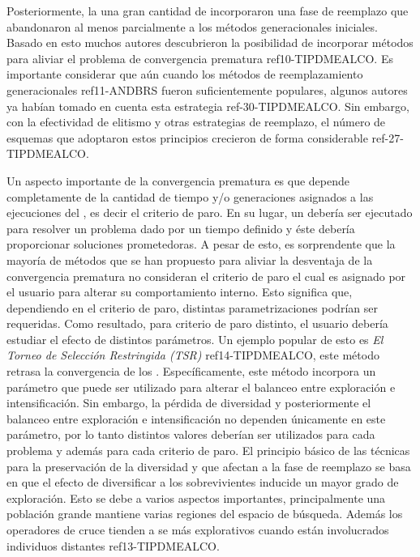 %
Posteriormente, la una gran cantidad de \EAS{} incorporaron una fase de reemplazo que abandonaron al menos parcialmente a los métodos generacionales iniciales.
%
Basado en esto muchos autores descubrieron la posibilidad de incorporar métodos para aliviar el problema de convergencia prematura ref10-TIPDMEALCO.
%
Es importante considerar que aún cuando los métodos de reemplazamiento generacionales ref11-ANDBRS fueron suficientemente populares, algunos autores ya habían tomado en cuenta esta estrategia ref-30-TIPDMEALCO.
%
Sin embargo, con la efectividad de elitismo y otras estrategias de reemplazo, el número de esquemas que adoptaron estos principios crecieron de forma considerable ref-27-TIPDMEALCO.
%

Un aspecto importante de la convergencia prematura es que depende completamente de la cantidad de tiempo y/o generaciones asignados a las ejecuciones del \EA{}, es decir el criterio de paro.
%
En su lugar, un \EA{} debería ser ejecutado para resolver un problema dado por un tiempo definido y éste debería proporcionar soluciones prometedoras.
%
A pesar de esto, es sorprendente que la mayoría de métodos que se han propuesto para aliviar la desventaja de la convergencia prematura no consideran el criterio de paro el cual es asignado por el usuario para alterar su comportamiento interno.
%
Esto significa que, dependiendo en el criterio de paro, distintas parametrizaciones podrían ser requeridas.
%
Como resultado, para criterio de paro distinto, el usuario debería estudiar el efecto de distintos parámetros.
%
Un ejemplo popular de esto es \textit{El Torneo de Selección Restringida (TSR)} ref14-TIPDMEALCO, este método retrasa la convergencia de los \EAS{}.
%
Específicamente, este método incorpora un parámetro que puede ser utilizado para alterar el balanceo entre exploración e intensificación.
%
Sin embargo, la pérdida de diversidad y posteriormente el balanceo entre exploración e intensificación no dependen únicamente en este parámetro, por lo tanto distintos valores deberían ser utilizados para cada problema y además para cada criterio de paro.
%
El principio básico de las técnicas para la preservación de la diversidad y que afectan a la fase de reemplazo se basa en que el efecto de diversificar a los sobrevivientes inducide un mayor grado de exploración.
%
Esto se debe a varios aspectos importantes, principalmente una población grande mantiene varias regiones del espacio de búsqueda.
%
Además los operadores de cruce tienden a se más explorativos cuando están involucrados individuos distantes ref13-TIPDMEALCO.


